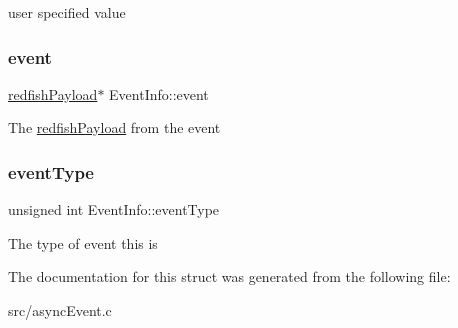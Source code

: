 user specified value \mbox{\label{structEventInfo_a1accd6f1a75475fbff4aafd612c56343}} 
\subsubsection{\texorpdfstring{event}{event}}
{\footnotesize\ttfamily \hyperlink{structredfishPayload}{redfish\+Payload}$\ast$ Event\+Info\+::event}

The \hyperlink{structredfishPayload}{redfish\+Payload} from the event \mbox{\label{structEventInfo_a5b1252707a2300785198051c0d8dd953}} 
\subsubsection{\texorpdfstring{event\+Type}{eventType}}
{\footnotesize\ttfamily unsigned int Event\+Info\+::event\+Type}

The type of event this is 

The documentation for this struct was generated from the following file\+:\begin{DoxyCompactItemize}
\item 
src/async\+Event.\+c\end{DoxyCompactItemize}
